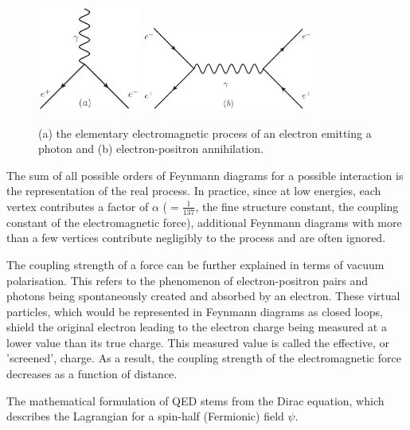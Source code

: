 \begin{figure}[hbtp]
   \centering
     \includegraphics[width=0.3\textwidth]{Chapters/03_Theory/Images/e_e_gamma}\hfill
     \includegraphics[width=0.5\textwidth]{Chapters/03_Theory/Images/e_e_gamma_e_e}
     \caption[Elementary electromagnetic processes.]{(a) the elementary electromagnetic process of an electron
     emitting a photon and (b) electron-positron annihilation.}
     \label{fig:qed_processes}
\end{figure}

The sum of all possible orders of Feynmann diagrams for a possible interaction is the representation of the
real process. In practice, since at low energies, each vertex contributes a factor of $\alpha$
($=\frac{1}{137}$, the fine structure constant, the coupling constant of the electromagnetic force),
additional Feynmann diagrams with more than a few vertices contribute negligibly to the process and are often
ignored.

The coupling strength of a force can be further explained in terms of vacuum polarisation. This refers to the
phenomenon of electron-positron pairs and photons being spontaneously created and absorbed by an electron.
These virtual particles, which would be represented in Feynmann diagrams as closed loops, shield the original
electron leading to the electron charge being measured at a lower value than its true charge. This measured
value is called the effective, or 'screened', charge. As a result, the coupling strength of the
electromagnetic force decreases as a function of distance.

The mathematical formulation of QED stems from the Dirac equation, which describes the Lagrangian for a
spin-half (Fermionic) field $\psi$.

